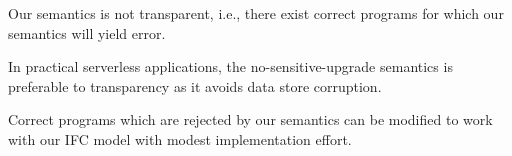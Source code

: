 \begin{conj}
Our semantics is not transparent, i.e., there exist correct programs for which our semantics
will yield error.
\end{conj}

\begin{conj}
In practical serverless applications, the no-sensitive-upgrade semantics is preferable to transparency
as it avoids data store corruption.
\end{conj}

\begin{conj}
Correct programs which are rejected by our semantics can be modified to work with our IFC model with modest implementation effort.
\end{conj}


